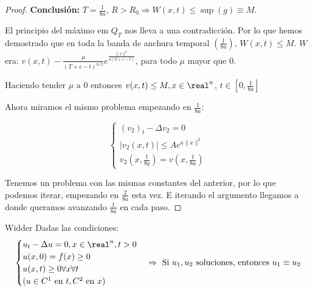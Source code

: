 \begin{proof}
 				\textbf{Conclusión:} $T = \frac{1}{8a}$, $R > R_0 \Rightarrow W(x,t) \leq \sup(g) \equiv M$.

 				El principio del máximo em $Q_T$ nos lleva a una contradicción. Por lo que hemos demostrado que en toda la banda de anchura temporal $(\frac{1}{8a})$, $W(x,t) \leq M$. $W$ era: $v(x,t) - \frac{\mu}{(T + \epsilon -t)^{n/2}} e^{\frac{\|x\|^2}{4(T + \epsilon - t)}} $, para todo $\mu$ mayor que 0.

 				Haciendo tender $\mu$ a 0 entonces $v(x,t) \leq M, x \in \real^n$, $t \in [0,\frac{1}{8a}]$

 				Ahora miramos el mismo problema empezando en $\frac{1}{8a}$:

 				\[\begin{cases}
 					(v_2)_t - \Delta v_2 = 0 \\
 					|v_2(x,t)| \leq A e^{a\|x\|^2} \\
 					v_2(x,\frac{1}{8q}) = v(x,\frac{1}{8a})
 				\end{cases}\]


 				Tenemos un problema con las mismas constantes del anterior, por lo que podemos iterar, empezando en $\frac{2}{8a}$ esta vez. E iterando el argumento llegamos a donde queramos avanzando $\frac{1}{8a}$ en cada paso.

 			\end{proof}

 			\begin{theorem}{Widder}
 				Dadas las condiciones:
 				\[\begin{cases}
 					u_t - \Delta u = 0, x \in \real^n, t > 0 \\
 					u(x,0) = f(x) \geq 0 \\
 					u(x,t) \geq 0 \forall x \forall t \\
 					(u \in C^1 \text{ en } t, C^2 \text{ en } x)
 				\end{cases} \Rightarrow \text{ Si } u_1,u_2 \text{ soluciones, entonces } u_1 \equiv u_2\]
 			\end{theorem}

